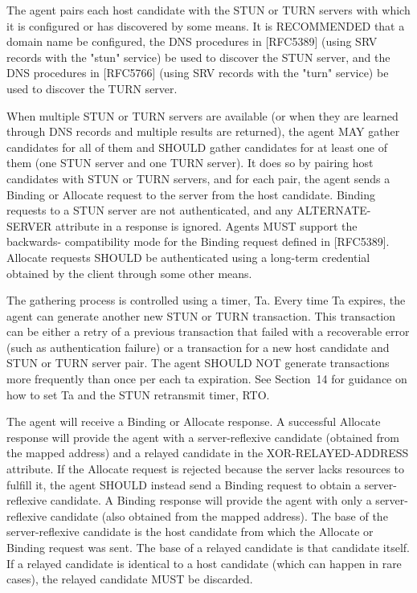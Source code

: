 \documentclass{article}
\begin{document}
The agent pairs each host candidate with the STUN or TURN servers with which it is configured or has discovered by some means.  It is RECOMMENDED that a domain name be configured, the DNS procedures in [RFC5389] (using SRV records with the "stun" service) be used to discover the STUN server, and the DNS procedures in [RFC5766] (using SRV records with the "turn" service) be used to discover the TURN server.

When multiple STUN or TURN servers are available (or when they are learned through DNS records and multiple results are returned), the agent MAY gather candidates for all of them and SHOULD gather candidates for at least one of them (one STUN server and one TURN server).  It does so by pairing host candidates with STUN or TURN servers, and for each pair, the agent sends a Binding or Allocate request to the server from the host candidate.  Binding requests to a STUN server are not authenticated, and any ALTERNATE-SERVER attribute in a response is ignored.  Agents MUST support the backwards- compatibility mode for the Binding request defined in [RFC5389]. Allocate requests SHOULD be authenticated using a long-term credential obtained by the client through some other means.

The gathering process is controlled using a timer, Ta.  Every time Ta expires, the agent can generate another new STUN or TURN transaction. This transaction can be either a retry of a previous transaction that failed with a recoverable error (such as authentication failure) or a transaction for a new host candidate and STUN or TURN server pair. The agent SHOULD NOT generate transactions more frequently than once per each ta expiration.  See Section~14 for guidance on how to set Ta and the STUN retransmit timer, RTO.

The agent will receive a Binding or Allocate response.  A successful Allocate response will provide the agent with a server-reflexive candidate (obtained from the mapped address) and a relayed candidate in the XOR-RELAYED-ADDRESS attribute.  If the Allocate request is rejected because the server lacks resources to fulfill it, the agent SHOULD instead send a Binding request to obtain a server-reflexive candidate.  A Binding response will provide the agent with only a server-reflexive candidate (also obtained from the mapped address). The base of the server-reflexive candidate is the host candidate from which the Allocate or Binding request was sent.  The base of a relayed candidate is that candidate itself.  If a relayed candidate is identical to a host candidate (which can happen in rare cases), the relayed candidate MUST be discarded.
\end{document}
